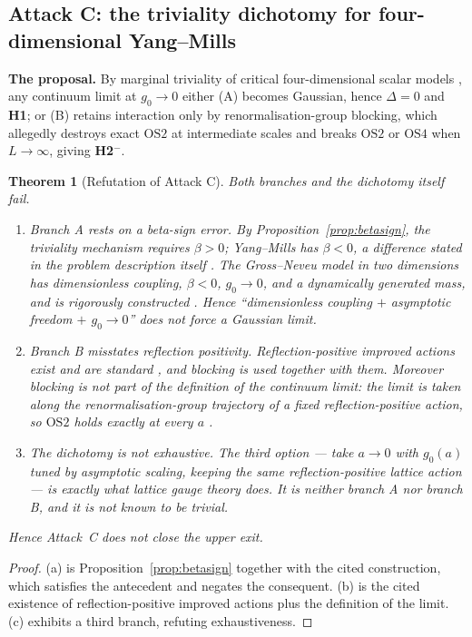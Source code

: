 \documentclass[11pt,a4paper]{article}
\theoremstyle{plain}
\newtheorem{theorem}{Theorem}[section]
\theoremstyle{definition}
\theoremstyle{remark}
\newcommand{\OS}{\mathrm{OS}}\newcommand{\Gap}{\mathrm{Gap}}
\renewcommand{\_}{\oldunderscore\allowbreak}
\begin{document}
\subsection{Attack C: the triviality dichotomy for four-dimensional Yang--Mills}
\textbf{The proposal.} By marginal triviality of critical four-dimensional scalar models
\cite{ADC2021}, any continuum limit at $g_0\to0$ either (A) becomes Gaussian, hence
$\Delta=0$ and \textbf{H1}; or (B) retains interaction only by renormalisation-group blocking,
which allegedly destroys exact $\OS2$ at intermediate scales and breaks $\OS2$ or $\OS4$ when
$L\to\infty$, giving \textbf{H2$^-$}.
\begin{theorem}[Refutation of Attack C]\label{thm:attackC}
Both branches and the dichotomy itself fail.
\begin{enumerate}[label=(\alph*),leftmargin=22pt,itemsep=2pt]
\item \emph{Branch A rests on a beta-sign error.} By Proposition~\ref{prop:betasign}, the
triviality mechanism requires $\beta>0$; Yang--Mills has $\beta<0$, a difference stated in the
problem description itself \cite{JaffeWitten2000}. The Gross--Neveu model in two dimensions has
dimensionless coupling, $\beta<0$, $g_0\to0$, and a dynamically generated mass, and is
\emph{rigorously constructed} \cite{FMRS1986,GK1985}. Hence ``dimensionless coupling $+$
asymptotic freedom $+$ $g_0\to0$'' does \emph{not} force a Gaussian limit.
\item \emph{Branch B misstates reflection positivity.} Reflection-positive improved actions
exist and are standard \cite{LuscherWeisz1985,Symanzik1985}, and blocking is used together with
them. Moreover \emph{blocking is not part of the definition of the continuum limit}: the limit
is taken along the renormalisation-group trajectory of a fixed reflection-positive action, so
$\OS2$ holds exactly at every $a$ \cite{OsterwalderSeiler1978}.
\item \emph{The dichotomy is not exhaustive.} The third option --- take $a\to0$ with $g_0(a)$
tuned by asymptotic scaling, keeping the same reflection-positive lattice action --- is exactly
what lattice gauge theory does. It is neither branch A nor branch B, and it is not known to be
trivial.
\end{enumerate}
Hence Attack~C does not close the upper exit.
\end{theorem}
\begin{proof}
(a) is Proposition~\ref{prop:betasign} together with the cited construction, which satisfies the
antecedent and negates the consequent. (b) is the cited existence of reflection-positive
improved actions plus the definition of the limit. (c) exhibits a third branch, refuting
exhaustiveness.
\end{proof}
\end{document}
